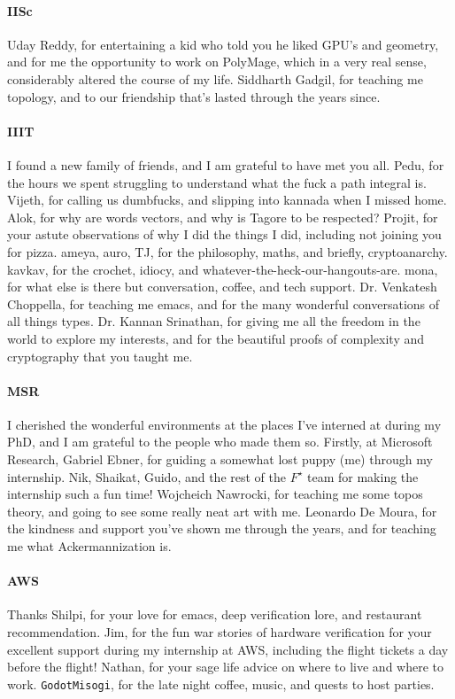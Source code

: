 \paragraph{IISc}
Uday Reddy, for entertaining a kid who told you he liked GPU's and geometry,
and for me the opportunity to work on PolyMage, which in a very real sense, considerably altered the course of my life.
Siddharth Gadgil, for teaching me topology, and to our friendship that's lasted through the years since.


\paragraph{IIIT} I found a new family of friends, and I am grateful to have met you all.
Pedu, for the hours we spent struggling to understand what the fuck a path integral is.
Vijeth, for calling us dumbfucks, and slipping into kannada when I missed home.
Alok, for why are words vectors, and why is Tagore to be respected?
Projit, for your astute observations of why I did the things I did, including not joining you for pizza.
ameya, auro, TJ, for the philosophy, maths, and briefly, cryptoanarchy.
kavkav, for the crochet, idiocy, and whatever-the-heck-our-hangouts-are.
mona, for what else is there but conversation, coffee, and tech support.
Dr. Venkatesh Choppella, for teaching me emacs,
and for the many wonderful conversations of all things types.
%
Dr. Kannan Srinathan, for giving me all the freedom in the world to explore my interests,
and for the beautiful proofs of complexity and cryptography that you taught me.
%


\paragraph{MSR}
I cherished the wonderful environments at the places I've interned at during my PhD, and I am grateful to the people who made them so.
Firstly, at Microsoft Research, Gabriel Ebner, for guiding a somewhat lost puppy (me) through my internship.
Nik, Shaikat, Guido, and the rest of the $F^{\star}$ team for making the internship such a fun time!
Wojcheich Nawrocki, for teaching me some topos theory, and going to see some really neat art with me.
Leonardo De Moura, for the kindness and support you've shown me through the years, and for teaching me what Ackermannization is.
\paragraph{AWS}
Thanks Shilpi, for your love for emacs, deep verification lore, and restaurant recommendation.
Jim, for the fun war stories of hardware verification for your excellent support during my internship at AWS, 
including the flight tickets a day before the flight! Nathan, for your sage life advice on where to live and where to work.
\texttt{GodotMisogi}, for the late night coffee, music, and quests to host parties.



